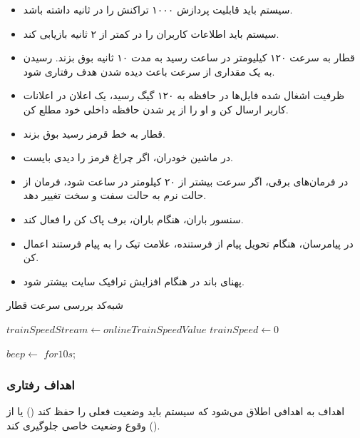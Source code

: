 \begin{itemize}
    \item سیستم باید قابلیت پردازش ۱۰۰۰ تراکنش را در ثانیه داشته باشد.
    \item سیستم باید اطلاعات کاربران را در کمتر از ۲ ثانیه بازیابی کند.
    \item قطار به سرعت ۱۲۰ کیلیومتر در ساعت رسید به مدت ۱۰ ثانیه بوق بزند. رسیدن
    به یک مقداری از سرعت باعث دیده شدن هدف رفتاری  شود.
    \item ظرفیت اشغال شده فایل‌ها در حافظه به ۱۲۰ گیگ رسید، یک اعلان در اعلانات
    کاربر ارسال کن و او را از پر شدن حافظه داخلی خود مطلع کن.
    \item قطار به خط قرمز رسید بوق بزند.
    \item در ماشین خودران، اگر چراغ قرمز را دیدی بایست.
    \item در فرمان‌های برقی، اگر سرعت بیشتر از ۲۰ کیلومتر در ساعت شود، فرمان از
    حالت نرم به حالت سفت و سخت تغییر دهد.
    \item سنسور باران، هنگام باران، برف پاک کن را فعال کند.
    \item در پیامرسان، هنگام تحویل پیام از فرستنده، علامت تیک را به پیام فرستند
    اعمال کن.
    \item پهنای باند در هنگام افزایش ترافیک سایت بیشتر شود.
\end{itemize}

\begin{algorithm}
    \caption{شبه‌کد بررسی سرعت قطار}
    \label{alg:trainSpeedAlgo}
    \begin{LTR}
        \begin{algorithmic}
            \State $trainSpeedStream \gets onlineTrainSpeedValue$
            \State $trainSpeed \gets 0$

                    \State $beep \gets$ $for 10s$;
                \EndIf
            \EndWhile
        \end{algorithmic}
    \end{LTR}
\end{algorithm}

\subsubsection{اهداف رفتاری }

اهداف  به اهدافی اطلاق می‌شود که سیستم باید وضعیت فعلی را حفظ
کند () یا از وقوع وضعیت خاصی جلوگیری کند ().


